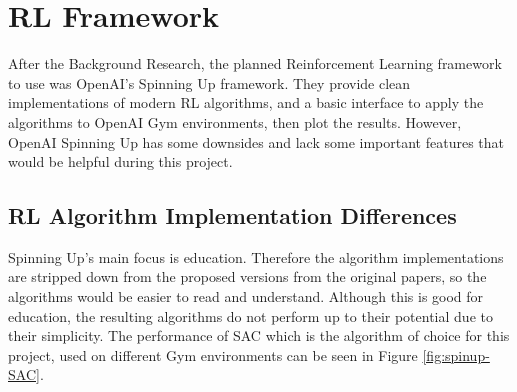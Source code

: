 \documentclass[12pt,twoside]{report}
\begin{document}
\section{RL Framework}
After the Background Research, the planned Reinforcement Learning framework to use was OpenAI's Spinning Up framework. They provide clean implementations of modern RL algorithms, and a basic interface to apply the algorithms to OpenAI Gym environments, then plot the results. However, OpenAI Spinning Up has some downsides and lack some important features that would be helpful during this project.

\subsection{RL Algorithm Implementation Differences} \label{RLF:imp-diff}
Spinning Up's main focus is education. Therefore the algorithm implementations are stripped down from the proposed versions from the original papers, so the algorithms would be easier to read and understand. Although this is good for education, the resulting algorithms do not perform up to their potential due to their simplicity. The performance of SAC which is the algorithm of choice for this project, used on different Gym environments can be seen in Figure \ref{fig:spinup-SAC}.
\end{document}

